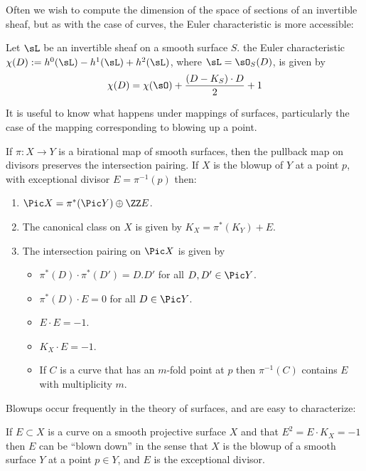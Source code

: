 Often we wish to compute the dimension of the space of sections of an invertible sheaf, but
as with the case of curves, the Euler characteristic is more accessible:

\begin{theorem} Let $\sL$ be an invertible sheaf on a smooth surface $S$.
the Euler characteristic $\chi(D) := h^0(\sL)-h^1(\sL)+h^2(\sL)$, where $\sL = \sO_S(D)$, is given by
$$
\chi(D) = \chi(\sO) + \frac{(D-K_S)\cdot D}{2}+1
$$
\end{theorem}


It is useful to know what happens under mappings of surfaces, particularly the case of the mapping
corresponding to blowing up a point.

\begin{theorem}
If $\pi: X \to Y$ is a birational map of smooth surfaces, then the pullback map on divisors
preserves the intersection pairing. If $X$ is the blowup of $Y$ at a point $p$, with exceptional
divisor $E = \pi^{-1}(p)$ then:

\begin{enumerate}
 \item $\Pic X =\pi^*(\Pic Y) \oplus \ZZ E$.
\item The canonical class on $X$ is given by $K_X = \pi^*(K_Y)+E$.
 \item The intersection pairing on $\Pic X$ is given by
 
\begin{itemize}
\item $\pi^*(D)\cdot\pi^*(D') = D.D'$ for all $D,D'\in \Pic Y$.
\item $\pi^*(D)\cdot E = 0$ for all $D\in \Pic Y$.
 \item $E\cdot E = -1$.
 \item $K_X\cdot E = -1$.
 \item If $C$ is a curve that has an $m$-fold point at $p$ then $\pi^{-1}(C)$ contains $E$ with multiplicity $m$.
 \end{itemize}
\end{enumerate}
\end{theorem}

Blowups occur frequently in the theory of surfaces, and are easy to characterize:
\begin{theorem}
If $E\subset X$ is a curve on a smooth projective surface $X$ and
 that $E^2 = E\cdot K_X = -1$ then $E$ can be ``blown down'' in the sense that
 $X$ is the blowup of a smooth surface $Y$ at a point $p\in Y$, and $E$ is the exceptional divisor.
\end{theorem}


